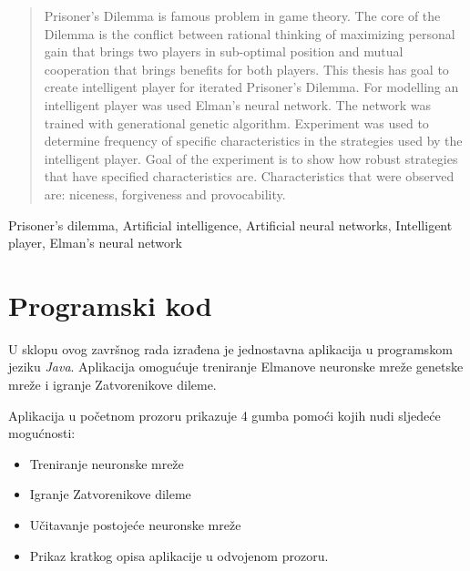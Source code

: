 \documentclass[zavrsnirad]{fer}
\begin{document}
\begin{abstract}
	
	Prisoner's Dilemma is famous problem in game theory. The core of the Dilemma is the conflict between rational thinking of maximizing personal gain that brings two players in sub-optimal position and mutual cooperation that brings benefits for both players. This thesis has goal to create intelligent player for iterated Prisoner's Dilemma. For modelling an intelligent player was used Elman's neural network. The network was trained with generational genetic algorithm. Experiment was used to determine frequency of specific characteristics in the strategies used by the intelligent player. Goal of the experiment is to show how robust strategies that have specified characteristics are. Characteristics that were observed are: niceness, forgiveness and provocability.
	
\end{abstract}

\begin{keywords}
  Prisoner's dilemma, Artificial intelligence, Artificial neural networks, Intelligent player, Elman's neural network
\end{keywords}



\backmatter

\chapter{Programski kod}

	U sklopu ovog završnog rada izrađena je jednostavna aplikacija u programskom jeziku \textit{Java}. Aplikacija omogućuje treniranje Elmanove neuronske mreže genetske mreže i igranje Zatvorenikove dileme.
	
	Aplikacija u početnom prozoru prikazuje 4 gumba pomoći kojih nudi sljedeće mogućnosti:
	\begin{itemize}
		\item Treniranje neuronske mreže
		\item Igranje Zatvorenikove dileme
		\item Učitavanje postojeće neuronske mreže
		\item Prikaz kratkog opisa aplikacije u odvojenom prozoru.
	\end{itemize}
	
\end{document}
